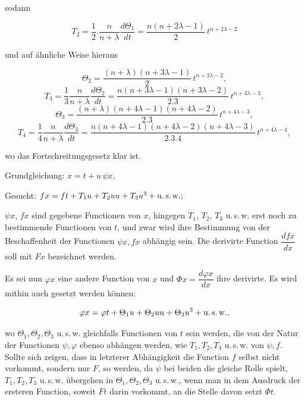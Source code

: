 %

\noindent sodann

\[ T_2 = \frac{1}{2}\mathord{.}\frac{n}{n+\lambda}\frac{d\Theta_1}{dt} = \frac{n(n+2\lambda-1)}{2}\, t^{n+2\lambda-2} \]

\noindent und auf ähnliche Weise hieraus

\[ \Theta_2 = \frac{(n+\lambda)(n+3\lambda-1)}{2}\, t^{n+3\lambda-2}, \]
\[ T_3 = \frac{1}{3}\frac{n}{n+\lambda}\frac{d\Theta_2}{dt} = \frac{n(n+3\lambda-1)(n+3\lambda-2)}{2.3}\, t^{n+3\lambda-3}, \]
\[ \Theta_3 = \frac{(n+\lambda)(n+4\lambda-1)(n+4\lambda-2)}{2.3}\, t^{n+4\lambda-3}, \]
\[ T_4 = \frac{1}{4}\frac{n}{n+\lambda}\frac{d\Theta_3}{dt} = \frac{n(n+4\lambda-1)(n+4\lambda-2)(n+4\lambda-3)}{2.3.4}\, t^{n+4\lambda-4}, \]

\noindent wo das Fortschreitungsgesetz klar ist.

\begin{center}\end{center}

\noindent Grundgleichung: \quad $x = t + u\,\psi x,$

\noindent Gesucht: \quad $fx = ft + T_1 u + T_2 uu + T_3 u^3 + \text{u.\,s.\,w.};$

\noindent $\psi x$, $fx$ sind gegebene Functionen von $x$, hingegen $T_1$, $T_2$, $T_3$ u.\,s.\,w. erst noch zu bestimmende Functionen von $t$, und zwar wird ihre Bestimmung von der Beschaffenheit der Functionen $\psi x, fx$ abhängig sein. Die derivirte Function $\dfrac{dfx}{dx}$ soll mit $Fx$ bezeichnet werden.

Es sei nun $\varphi x$ eine andere Function von $x$ und $\Phi x = \dfrac{d\varphi x}{dx}$ ihre derivirte. Es wird mithin auch gesetzt werden können:

\[ \varphi x = \varphi t + \Theta_1 u + \Theta_2 uu + \Theta_3 u^3 + \text{u.\,s.\,w.}, \]

\noindent wo $\Theta_1, \Theta_2, \Theta_3$ u.\,s.\,w. gleichfalls Functionen von $t$ sein werden, die von der Natur der Functionen $\psi, \varphi$ ebenso abhängen werden, wie $T_1, T_2, T_3$ u.\,s.\,w. von $\psi, f$. Sollte sich zeigen, dass in letzterer Abhängigkeit die Function $f$ selbst nicht vorkommt, sondern nur $F$, so werden, da $\psi$ bei beiden die gleiche Rolle spielt, $T_1, T_2, T_3$ u.\,s.\,w. übergehen in $\Theta_1, \Theta_2, \Theta_3$ u.\,s.\,w., wenn man in dem Ausdruck der ersteren Function, soweit $Ft$ darin vorkommt, an die Stelle davon setzt $\Phi t$.
